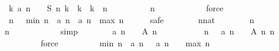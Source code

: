 \begin{isabellebody}
\ {\isachardoublequoteopen}{\isasymexists}\ k{\isachardot}\ a\ {\isacharparenleft}n\ {\isacharminus}\ {}{\isacharparenright}\ {\isacharequal}\ {\isacharquery}S\ n\ k\ {\isacharslash}\ k\ {\isasymand}\ k\ {\isasymin}\ {\isacharbraceleft}{}{\isachardot}{\isachardot}{\isacharless}n{\isacharplus}{}{\isacharbraceright}{\isachardoublequoteclose}\isanewline
\ \ \ \ \ \ \ \ \isamarkupfalse%
\ {\isacharbackquoteopen}n\ {\isasymge}\ {}{\isacharbackquoteclose}\isanewline
\ \ \ \ \ \ \ \ \isamarkupfalse%
\ force\isanewline
\ \ \ \ \isamarkupfalse%
\isanewline
\isanewline
\ \ \ \ \isamarkupfalse%
\ {\isachardoublequoteopen}{\isasymforall}\ n\ {\isasymge}\ {}{\isachardot}\ {\isacharquery}min\ n\ {\isasymle}\ a\ {\isacharparenleft}n{\isacharminus}{}{\isacharparenright}\ {\isasymand}\ a\ {\isacharparenleft}n{\isacharminus}{}{\isacharparenright}\ {\isasymle}\ {\isacharquery}max\ n{\isachardoublequoteclose}\isanewline
\ \ \ \ \isamarkupfalse%
\ safe\isanewline
\ \ \ \ \ \ \isamarkupfalse%
\ n{\isacharcolon}{\isacharcolon}nat\isanewline
\ \ \ \ \ \ \isamarkupfalse%
\ {\isachardoublequoteopen}n\ {\isasymge}\ {}{\isachardoublequoteclose}\isanewline
\ \ \ \ \ \ \isamarkupfalse%
\ \isamarkupfalse%
\ {\isachardoublequoteopen}n\ {\isasymge}\ {}{\isachardoublequoteclose}\isanewline
\ \ \ \ \ \ \ \ \isamarkupfalse%
\ simp\isanewline
\ \ \ \ \ \ \isamarkupfalse%
\ {\isachardoublequoteopen}a\ {\isacharparenleft}n\ {\isacharminus}\ {}{\isacharparenright}\ {\isasymin}\ {\isacharquery}A\ n{\isachardoublequoteclose}\isanewline
\ \ \ \ \ \ \ \ \isamarkupfalse%
\ {\isacharbackquoteopen}{\isasymforall}\ n\ {\isasymge}\ {}{\isachardot}\ a\ {\isacharparenleft}n\ {\isacharminus}\ {}{\isacharparenright}\ {\isasymin}\ {\isacharquery}A\ n{\isacharbackquoteclose}\ {\isacharbackquoteopen}n\ {\isasymge}\ {}{\isacharbackquoteclose}\isanewline
\ \ \ \ \ \ \ \ \isamarkupfalse%
\ force\isanewline
\ \ \ \ \ \ \isamarkupfalse%
\ \isamarkupfalse%
\ {\isachardoublequoteopen}{\isacharquery}min\ n\ {\isasymle}\ a\ {\isacharparenleft}n\ {\isacharminus}\ {}{\isacharparenright}{\isachardoublequoteclose}\ {\isachardoublequoteopen}a\ {\isacharparenleft}n\ {\isacharminus}\ {}{\isacharparenright}\ {\isasymle}\ {\isacharquery}max\ n{\isachardoublequoteclose}\isanewline

\end{isabellebody}
